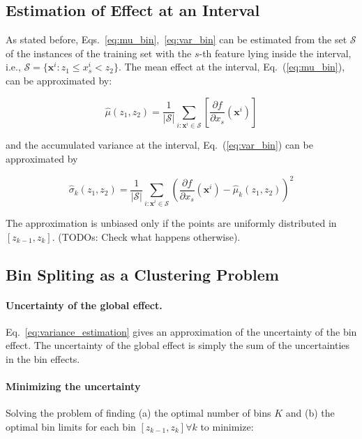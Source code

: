 \documentclass[twoside]{article}
\newcommand{\dfdx}{\frac{\partial f}{\partial x_s}}
\begin{document}
\subsection{Estimation of Effect at an Interval}

As stated before, Eqs.~\eqref{eq:mu_bin},~\eqref{eq:var_bin} can be
estimated from the set \(\mathcal{S}\) of the instances of the
training set with the \(s\)-th feature lying inside the interval,
i.e., \( \mathcal{S}= \{ \mathbf{x}^i : z_1 \leq x^i_s < z_2 \}
\). The mean effect at the interval, Eq.~(\ref{eq:mu_bin}), can be approximated
by:

\begin{equation}
  \label{eq:mean_estimation}
  \hat{\mu}(z_1, z_2) = \frac{1}{|\mathcal{S}|} \sum_{i:\mathbf{x}^i \in
    \mathcal{S}} \left [ \dfdx(\mathbf{x}^i) \right ]
\end{equation}

and the accumulated variance at the interval, Eq.~(\ref{eq:var_bin})
can be approximated by

\begin{equation}
  \label{eq:variance_estimation}
  \hat{\sigma}_k(z_1, z_2) = \frac{1}{|\mathcal{S}|} \sum_{i:\mathbf{x}^i \in
  \mathcal{S}} \left ( \dfdx(\mathbf{x}^i) - \hat{\mu}_k(z_1, z_2) \right )^2
\end{equation}

The approximation is unbiased only if the points are uniformly
distributed in \([z_{k-1}, z_k]\). (TODOs: Check what happens
otherwise).

\subsection{Bin Spliting as a Clustering Problem}

\paragraph{Uncertainty of the global effect.}

Eq.~\eqref{eq:variance_estimation} gives an approximation of the
uncertainty of the bin effect.
The uncertainty of the global effect is
simply the sum of the uncertainties in the bin effects.

\paragraph{Minimizing the uncertainty}

Solving the problem of finding (a) the optimal number of bins \(K\) and (b) the optimal bin limits for each bin \([z_{k-1}, z_k] \forall k\) to minimize:
\end{document}
